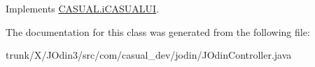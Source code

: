 Implements \hyperlink{interface_c_a_s_u_a_l_1_1i_c_a_s_u_a_l_u_i_a8dcf6547f0bf15b2fb7ac176d8e649c1}{C\-A\-S\-U\-A\-L.\-i\-C\-A\-S\-U\-A\-L\-U\-I}.



The documentation for this class was generated from the following file\-:\begin{DoxyCompactItemize}
\item 
trunk/\-X/\-J\-Odin3/src/com/casual\-\_\-dev/jodin/J\-Odin\-Controller.\-java\end{DoxyCompactItemize}
